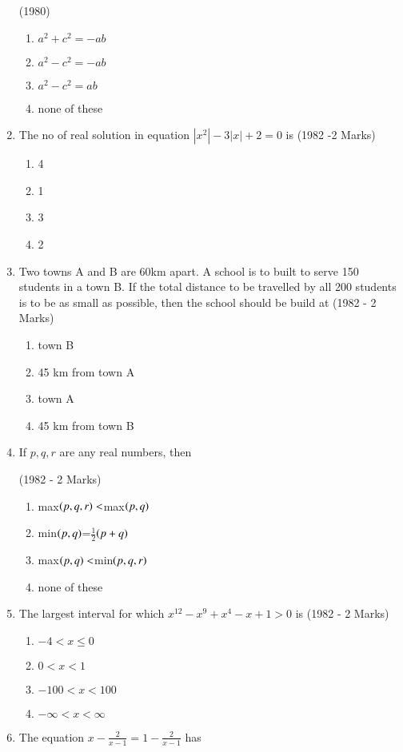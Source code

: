 \documentclass[journal,12pt,twocolumn]{IEEEtran}
\theoremstyle{remark}
\begin{document}
\begin{enumerate}
\hfill (1980)
\begin{enumerate} 
\item$a^2+c^2=-ab$\item $a^2-c^2=-ab$\item $a^2-c^2=ab$\item none of these
\end{enumerate}
\item The no of real solution in equation $|x^2|-3|x|+2=0$ is \hfill (1982 -2 Marks)
\begin{enumerate} 
\item 4\item 1\item 3\item 2
\end{enumerate}
\item Two towns A and B are 60km apart. A school is to built to serve 150 students in a town B. If the total distance to be travelled by all 200 students is to be as small as possible, then the school should be build at \hfill (1982 - 2 Marks)
\begin{enumerate}
\item town B\item 45 km from town A\item town A\item 45 km from town B
\end{enumerate}
\item If $p,q,r$ are any real numbers, then 

\hfill (1982 - 2 Marks)
\begin{enumerate}
\item max$\left(p,q,r\right)<$max$\left(p,q\right)$\item min$\left(p,q\right)$=$\frac{1}{2}$$\left(p+q\right)$\item max$\left(p,q\right)<$min$\left(p,q,r\right)$\item  none of these
\end{enumerate}
\item The largest interval for which $x^{12}-x^9+x^4-x+1>0$ is \hfill (1982 - 2 Marks)
\begin{enumerate}
\item $-4<x\leq0$\item $0<x<1$\item $-100<x<100$\item $-\infty<x<\infty$
\end{enumerate}
\item The equation $x-\frac{2}{x-1}=1-\frac{2}{x-1}$ has


\end{enumerate}
\end{document}
